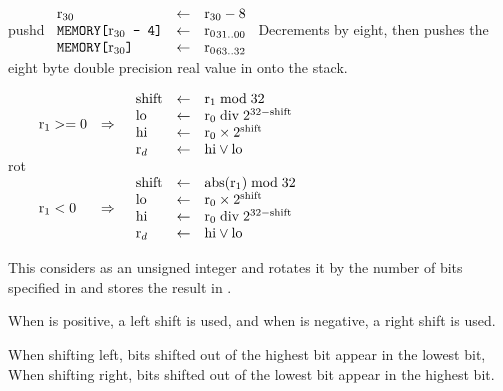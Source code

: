 \begin{instruction}{pushd}\label{inst:pushd}
     {\pushdopc}
     {
       \begin{math}
         \begin{array}{lcl}
           \textrm{r}_{30}                           & \leftarrow & \textrm{r}_{30} - 8 \\
           \texttt{MEMORY[\textrm{\ensuremath{\textrm{r}_{30}}} - 4]} & \leftarrow & {\textrm{r}_{0}}_{31..00} \\
           \texttt{MEMORY[\textrm{\ensuremath{\textrm{r}_{30}}}]} & \leftarrow & {\textrm{r}_{0}}_{63..32} \\
         \end{array}
       \end{math}
     }
     {
       Decrements  by eight, then pushes the eight byte double
       precision real value in  onto the stack.
     }
\end{instruction}


\begin{instruction}{rot}
     {\rrotropc}
     {
       \begin{math}
         \begin{array}{lcl}
           \sr{1} >= 0 & \implies & \begin{array}{lcl}
             \textrm{shift} & \becomes & \sr{1} \bmod 32 \\
             \textrm{lo} & \becomes & {\sr{0}} \bdiv {2^{32 - \textrm{shift}}} \\
             \textrm{hi} & \becomes & \sr{0} \times 2^{\textrm{shift}} \\
             \dr & \becomes & \textrm{hi}\vee \textrm{lo} \\
           \end{array} \\
           & & \\
           \sr{1} < 0 & \implies & \begin{array}{lcl}
             \textrm{shift} & \becomes & \abs{\sr{1}} \bmod 32 \\
             \textrm{lo} & \becomes & \sr{0} \times 2^{\textrm{shift}} \\
             \textrm{hi} & \becomes & {\sr{0}} \bdiv {2^{32 - \textrm{shift}}} \\
             \dr & \becomes & \textrm{hi}\vee \textrm{lo} \\
           \end{array}
         \end{array}
       \end{math}
     }
     {
       This considers  as an unsigned integer and rotates it by
       the number of bits specified in  and stores the result in
       \dr.

       When  is positive, a left shift is used, and when 
       is negative, a right shift is used.

       When shifting left, bits shifted out of the highest bit appear
       in the lowest bit, When shifting right, bits shifted out of the
       lowest bit appear in the highest bit.
     }
\end{instruction}


